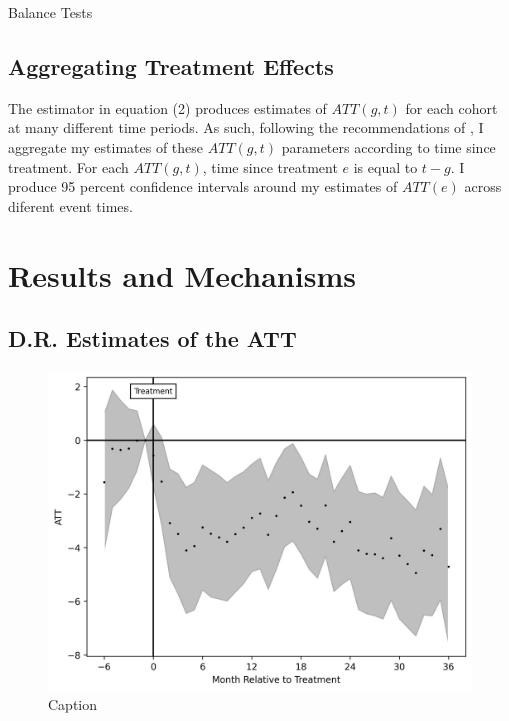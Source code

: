 \documentclass[12pt]{article}
\begin{document}
    \begin{landscape}
        
    \begin{table}[H]
        \centering
        
        \caption{Balance Tests}
        \label{tab:my_label}
    \end{table} 
    
    \end{landscape}


    \subsection{Aggregating Treatment Effects}
        The estimator in equation (2) produces estimates of $ATT(g, t)$ for each cohort at many different time periods. As such, following the recommendations of \cite{callaway_difference--differences_2021}, I aggregate my estimates of these $ATT(g, t)$ parameters according to time since treatment. For each $ATT(g, t)$, time since treatment $e$ is equal to $t-g$. I produce 95 percent confidence intervals around my estimates of $ATT(e)$ across diferent event times.
    
\section{Results and Mechanisms} \label{sec:result}

    \subsection{D.R. Estimates of the ATT}
    \begin{figure}
        \centering
        \includegraphics{output/group_0_crimes_500m/figures/att_gt_dr_event_study_long_horizon.png}
        \caption{Caption}
        \label{fig:my_label}
    \end{figure}
\end{document}
